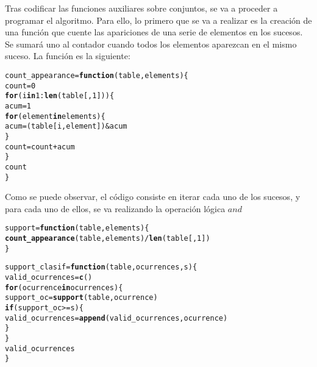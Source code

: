 \documentclass[12pt]{report}\usepackage[]{graphicx}\usepackage[dvipsnames]{xcolor}
\makeatletter
\newcommand{\hlnum}[1]{\textcolor[rgb]{0.686,0.059,0.569}{#1}}%
\newcommand{\hlopt}[1]{\textcolor[rgb]{0,0,0}{#1}}%
\newcommand{\hlstd}[1]{\textcolor[rgb]{0.345,0.345,0.345}{#1}}%
\newcommand{\hlkwa}[1]{\textcolor[rgb]{0.161,0.373,0.58}{\textbf{#1}}}%
\newcommand{\hlkwb}[1]{\textcolor[rgb]{0.69,0.353,0.396}{#1}}%
\newcommand{\hlkwc}[1]{\textcolor[rgb]{0.333,0.667,0.333}{#1}}%
\newcommand{\hlkwd}[1]{\textcolor[rgb]{0.737,0.353,0.396}{\textbf{#1}}}%
\newenvironment{kframe}{%
 \def\at@end@of@kframe{}%
 \ifinner\ifhmode%
  \def\at@end@of@kframe{\end{minipage}}%
  \begin{minipage}{\columnwidth}%
 \fi\fi%
 \def\FrameCommand##1{\hskip\@totalleftmargin \hskip-\fboxsep
 \colorbox{shadecolor}{##1}\hskip-\fboxsep
     \hskip-\linewidth \hskip-\@totalleftmargin \hskip\columnwidth}%
 \MakeFramed {\advance\hsize-\width
   \@totalleftmargin\z@ \linewidth\hsize
   \@setminipage}}%
 {\par\unskip\endMakeFramed%
 \at@end@of@kframe}
\newenvironment{knitrout}{}{} %
\makeatother
\begin{document}
			Tras codificar las funciones auxiliares sobre conjuntos, se va a proceder a programar el algoritmo. Para ello, lo primero que se va a realizar es la creación de una función que cuente las apariciones de una serie de elementos en los sucesos. Se sumará uno al contador cuando todos los elementos aparezcan en el mismo suceso. La función es la siguiente:
			
\begin{knitrout}
\color{fgcolor}\begin{kframe}
\begin{alltt}
\hlstd{count_appearance} \hlkwb{=} \hlkwa{function}\hlstd{(}\hlkwc{table}\hlstd{,} \hlkwc{elements}\hlstd{) \{}
        \hlstd{count} \hlkwb{=} \hlnum{0}
        \hlkwa{for} \hlstd{(i} \hlkwa{in} \hlnum{1}\hlopt{:}\hlkwd{len}\hlstd{(table[,}\hlnum{1}\hlstd{])) \{}
                \hlstd{acum} \hlkwb{=} \hlnum{1}
                \hlkwa{for} \hlstd{(element} \hlkwa{in} \hlstd{elements) \{}
                        \hlstd{acum} \hlkwb{=} \hlstd{(table[i,element])} \hlopt{&} \hlstd{acum}
                \hlstd{\}}
                \hlstd{count} \hlkwb{=} \hlstd{count} \hlopt{+} \hlstd{acum}
        \hlstd{\}}
        \hlstd{count}
\hlstd{\}}
\end{alltt}
\end{kframe}
\end{knitrout}
			
			Como se puede observar, el código consiste en iterar cada uno de los sucesos, y para cada uno de ellos, se va realizando la operación lógica $and$
			
\begin{knitrout}
\color{fgcolor}\begin{kframe}
\begin{alltt}
\hlstd{support} \hlkwb{=} \hlkwa{function}\hlstd{(}\hlkwc{table}\hlstd{,} \hlkwc{elements}\hlstd{) \{}
        \hlkwd{count_appearance}\hlstd{(table, elements)} \hlopt{/} \hlkwd{len}\hlstd{(table[,}\hlnum{1}\hlstd{])}
\hlstd{\}}

\hlstd{support_clasif} \hlkwb{=} \hlkwa{function}\hlstd{(}\hlkwc{table}\hlstd{,} \hlkwc{ocurrences}\hlstd{,} \hlkwc{s}\hlstd{) \{}
        \hlstd{valid_ocurrences} \hlkwb{=} \hlkwd{c}\hlstd{()}
        \hlkwa{for} \hlstd{(ocurrence} \hlkwa{in} \hlstd{ocurrences) \{}
                \hlstd{support_oc} \hlkwb{=} \hlkwd{support}\hlstd{(table, ocurrence)}
                \hlkwa{if} \hlstd{(support_oc} \hlopt{>=} \hlstd{s) \{}
                        \hlstd{valid_ocurrences} \hlkwb{=} \hlkwd{append}\hlstd{(valid_ocurrences, ocurrence)}
                \hlstd{\}}
        \hlstd{\}}
        \hlstd{valid_ocurrences}
\hlstd{\}}
\end{alltt}
\end{kframe}
\end{knitrout}
			
\end{document}
